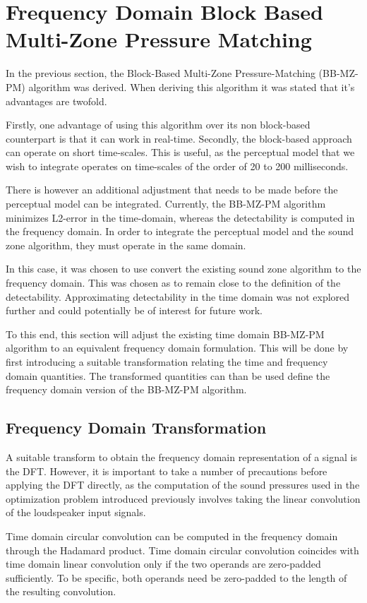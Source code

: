 \section{Frequency Domain Block Based Multi-Zone Pressure Matching}
In the previous section, the Block-Based Multi-Zone Pressure-Matching (BB-MZ-PM) algorithm was derived.
When deriving this algorithm it was stated that it's advantages are twofold.

Firstly, one advantage of using this algorithm over its non block-based counterpart is that it can work in real-time.
Secondly, the block-based approach can operate on short time-scales.
This is useful, as the perceptual model that we wish to integrate operates on time-scales of the order of 20 to 200 milliseconds.

There is however an additional adjustment that needs to be made before the perceptual model can be integrated. 
Currently, the BB-MZ-PM algorithm minimizes L2-error in the time-domain, whereas the detectability is computed in the frequency domain.
In order to integrate the perceptual model and the sound zone algorithm, they must operate in the same domain.

In this case, it was chosen to use convert the existing sound zone algorithm to the frequency domain.
This was chosen as to remain close to the definition of the detectability.
Approximating detectability in the time domain was not explored further and could potentially be of interest for future work.

To this end, this section will adjust the existing time domain BB-MZ-PM algorithm to an equivalent frequency domain formulation.
This will be done by first introducing a suitable transformation relating the time and frequency domain quantities.
The transformed quantities can than be used define the frequency domain version of the BB-MZ-PM algorithm.

\subsection{Frequency Domain Transformation}
A suitable transform to obtain the frequency domain representation of a signal is the DFT.
However, it is important to take a number of precautions before applying the DFT directly,
as the computation of the sound pressures used in the optimization problem introduced previously involves taking the 
linear convolution of the loudspeaker input signals.

Time domain circular convolution can be computed in the frequency domain through the Hadamard product.
Time domain circular convolution coincides with time domain linear convolution only if the two operands are zero-padded sufficiently.
To be specific, both operands need be zero-padded to the length of the resulting convolution.

